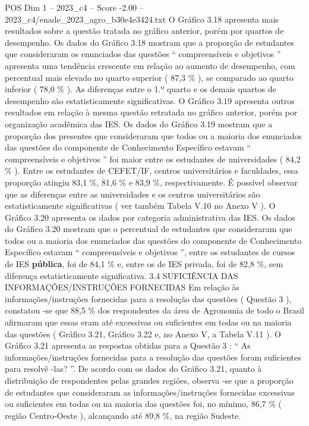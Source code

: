 \begin{textsample}{POS Dim 1 – 2023\_c4 – Score -2.00 – 2023\_c4/enade\_2023\_agro\_b30e4e3424.txt}
O Gráfico 3.18 apresenta mais resultados sobre a questão tratada no gráfico anterior, porém por quartos de desempenho.
Os dados do Gráfico 3.18 mostram que a proporção de estudantes que consideraram os enunciados das questões “ compreensíveis e objetivos ” apresenta uma tendência crescente em relação ao aumento de desempenho, com percentual mais elevado no quarto superior ( 87,3 \% ), se comparado ao quarto inferior ( 78,0 \% ).
As diferenças entre o 1.º quarto e os demais quartos de desempenho são estatisticamente significativas.
O Gráfico 3.19 apresenta outros resultados em relação à mesma questão retratada no gráfico anterior, porém por organização acadêmica das IES.
Os dados do Gráfico 3.19 mostram que a proporção dos presentes que consideraram que todos ou a maioria dos enunciados das questões do componente de Conhecimento Específico estavam “ compreensíveis e objetivos ” foi maior entre os estudantes de universidades ( 84,2 \% ).
Entre os estudantes de CEFET/IF, centros universitários e faculdades, essa proporção atingiu 83,1 \%, 81,6 \% e 83,9 \%, respectivamente.
É possível observar que as diferenças entre as universidades e os centros universitários são estatisticamente significativas ( ver também Tabela V.10 no Anexo V ).
O Gráfico 3.20 apresenta os dados por categoria administrativa das IES.
Os dados do Gráfico 3.20 mostram que o percentual de estudantes que consideraram que todos ou a maioria dos enunciados das questões do componente de Conhecimento Específico estavam “ compreensíveis e objetivos ”, entre os estudantes de cursos de IES \textbf{pública}, foi de 84,1 \% e, entre os de IES privada, foi de 82,8 \%, sem diferença estatisticamente significativa. 3.4 SUFICIÊNCIA DAS INFORMAÇÕES/INSTRUÇÕES FORNECIDAS Em relação às informações/instruções fornecidas para a resolução das questões ( Questão 3 ), constatou -se que 88,5 \% dos respondentes da área de Agronomia de todo o Brasil afirmaram que essas eram até excessivas ou suficientes em todas ou na maioria das questões ( Gráfico 3.21, Gráfico 3.22 e, no Anexo V, a Tabela V.11 ).
O Gráfico 3.21 apresenta as respostas obtidas para a Questão 3 : “ As informações/instruções fornecidas para a resolução das questões foram suficientes para resolvê -las? ”.
De acordo com os dados do Gráfico 3.21, quanto à distribuição de respondentes pelas grandes regiões, observa -se que a proporção de estudantes que consideraram as informações/instruções fornecidas excessivas ou suficientes em todas ou na maioria das questões foi, no mínimo, 86,7 \% ( região Centro-Oeste ), alcançando até 89,8 \%, na região Sudeste.

\end{textsample}
